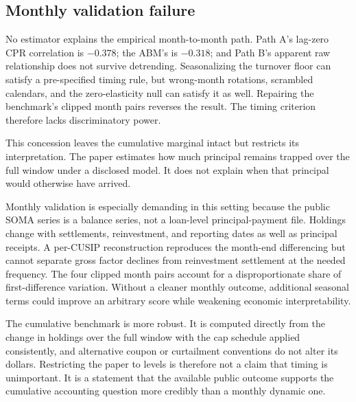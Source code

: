 \subsection{Monthly validation failure}

No estimator explains the empirical month-to-month path. Path A's lag-zero CPR correlation is $-0.378$; the ABM's is $-0.318$; and Path B's apparent raw relationship does not survive detrending. Seasonalizing the turnover floor can satisfy a pre-specified timing rule, but wrong-month rotations, scrambled calendars, and the zero-elasticity null can satisfy it as well. Repairing the benchmark's clipped month pairs reverses the result. The timing criterion therefore lacks discriminatory power.

This concession leaves the cumulative marginal intact but restricts its interpretation. The paper estimates how much principal remains trapped over the full window under a disclosed model. It does not explain when that principal would otherwise have arrived.

Monthly validation is especially demanding in this setting because the public SOMA series is a balance series, not a loan-level principal-payment file. Holdings change with settlements, reinvestment, and reporting dates as well as principal receipts. A per-CUSIP reconstruction reproduces the month-end differencing but cannot separate gross factor declines from reinvestment settlement at the needed frequency. The four clipped month pairs account for a disproportionate share of first-difference variation. Without a cleaner monthly outcome, additional seasonal terms could improve an arbitrary score while weakening economic interpretability.

The cumulative benchmark is more robust. It is computed directly from the change in holdings over the full window with the cap schedule applied consistently, and alternative coupon or curtailment conventions do not alter its dollars. Restricting the paper to levels is therefore not a claim that timing is unimportant. It is a statement that the available public outcome supports the cumulative accounting question more credibly than a monthly dynamic one.

